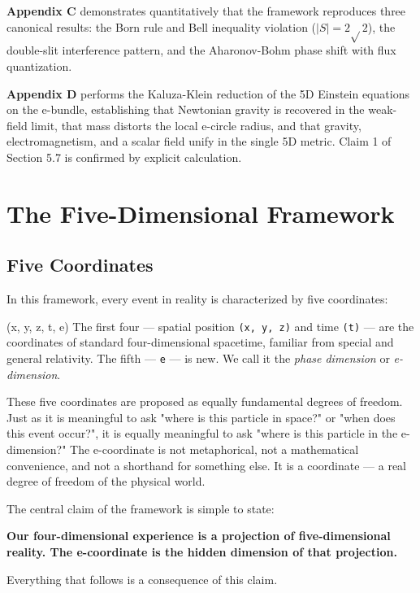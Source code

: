 \documentclass[aps,prd,preprint,superscriptaddress,longbibliography,floatfix]{revtex4-2}
\theoremstyle{remark}
\begin{document}
\textbf{Appendix C} demonstrates quantitatively that the framework reproduces three canonical results: the Born rule and Bell inequality violation ($|S| = 2\sqrt{}2$), the double-slit interference pattern, and the Aharonov-Bohm phase shift with flux quantization.

\textbf{Appendix D} performs the Kaluza-Klein reduction of the 5D Einstein equations on the e-bundle, establishing that Newtonian gravity is recovered in the weak-field limit, that mass distorts the local e-circle radius, and that gravity, electromagnetism, and a scalar field unify in the single 5D metric. Claim 1 of Section 5.7 is confirmed by explicit calculation.


\section{The Five-Dimensional Framework}



\subsection{Five Coordinates}

In this framework, every event in reality is characterized by five coordinates:


(x, y, z, t, e)
The first four --- spatial position \texttt{(x, y, z)} and time \texttt{(t)} --- are the coordinates of standard four-dimensional spacetime, familiar from special and general relativity. The fifth --- \texttt{e} --- is new. We call it the \textit{phase dimension} or \textit{e-dimension}.

These five coordinates are proposed as equally fundamental degrees of freedom. Just as it is meaningful to ask "where is this particle in space?" or "when does this event occur?", it is equally meaningful to ask "where is this particle in the e-dimension?" The e-coordinate is not metaphorical, not a mathematical convenience, and not a shorthand for something else. It is a coordinate --- a real degree of freedom of the physical world.

The central claim of the framework is simple to state:

\textbf{Our four-dimensional experience is a projection of five-dimensional reality. The e-coordinate is the hidden dimension of that projection.}

Everything that follows is a consequence of this claim.
\end{document}
